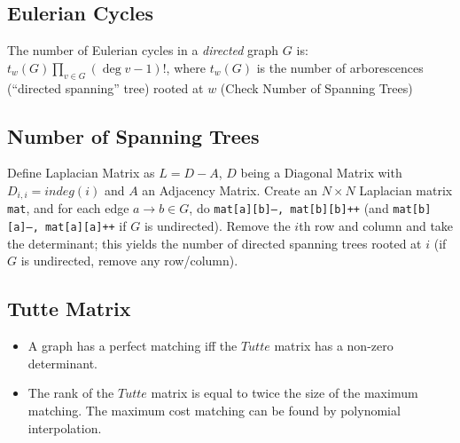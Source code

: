 \subsection{Eulerian Cycles}
The number of Eulerian cycles in a \emph{directed} graph $G$ is: $t_w(G) \prod_{v \in G} (\deg v - 1)!$,
where $t_w(G)$ is the number of arborescences (``directed spanning'' tree) rooted at $w$
(Check Number of Spanning Trees)\\

\subsection{Number of Spanning Trees}
		Define Laplacian Matrix as $L = D - A$, $D$ being a Diagonal Matrix with $D_{i,i} = indeg(i)$ and $A$ an Adjacency Matrix.
		Create an $N\times N$ Laplacian matrix \texttt{mat}, and for each edge $a \rightarrow b \in G$, do
		\texttt{mat[a][b]--, mat[b][b]++} (and \texttt{mat[b][a]--, mat[a][a]++} if $G$ is undirected).
		Remove the $i$th row and column and take the determinant; this yields the number of directed spanning trees rooted at $i$
		(if $G$ is undirected, remove any row/column).

\subsection{Tutte Matrix}
	\begin{itemize}
	\item A graph has a perfect matching iff the $Tutte$ matrix has a non-zero determinant.
	\item The rank of the $Tutte$ matrix is equal to twice the size of the maximum matching. The maximum cost matching can be found by polynomial interpolation.
	\end{itemize}



